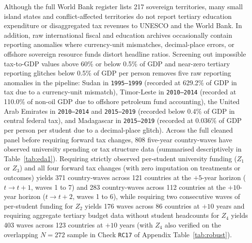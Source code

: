 \documentclass[11pt,a4paper]{article}
\begin{document}
Although the full World Bank register lists 217 sovereign territories, many small island states and conflict-affected territories do not report tertiary education expenditure or disaggregated tax revenues to UNESCO and the World Bank. In addition, raw international fiscal and education archives occasionally contain reporting anomalies where currency-unit mismatches, decimal-place errors, or offshore sovereign resource funds distort headline ratios. Screening out impossible tax-to-GDP values above 60\% or below 0.5\% of GDP and near-zero tertiary reporting glitches below 0.5\% of GDP per person removes five raw reporting anomalies in the pipeline: Sudan in \texttt{1995--1999} (recorded at 629.2\% of GDP in tax due to a currency-unit mismatch), Timor-Leste in \texttt{2010--2014} (recorded at 110.0\% of non-oil GDP due to offshore petroleum fund accounting), the United Arab Emirates in \texttt{2010--2014} and \texttt{2015--2019} (recorded below 0.4\% of GDP in central federal tax), and Madagascar in \texttt{2015--2019} (recorded at 0.036\% of GDP per person per student due to a decimal-place glitch). Across the full cleaned panel before requiring forward tax changes, 808 five-year country-waves have observed university spending or tax structure data (summarised descriptively in Table~\ref{tab:eda1}). Requiring strictly observed per-student university funding ($Z_1$ or $Z_3$) and all four forward tax changes (with zero imputation on treatments or outcomes) yields 371 country-waves across 121 countries at the $+5$-year horizon ($t \to t+1$, waves 1 to 7) and 283 country-waves across 112 countries at the $+10$-year horizon ($t \to t+2$, waves 1 to 6), while requiring two consecutive waves of per-student funding for $Z_2$ yields 176 waves across 86 countries at $+10$ years and requiring aggregate tertiary budget data without student headcounts for $Z_4$ yields 403 waves across 123 countries at $+10$ years (with $Z_4$ also verified on the overlapping $N = 272$ sample in Check \texttt{RC17} of Appendix Table~\ref{tab:robust}).
\end{document}
